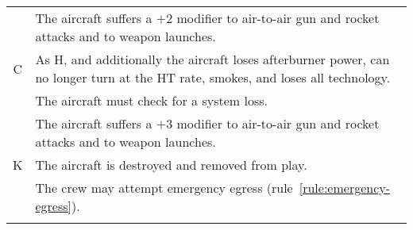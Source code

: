 \begin{onecolumntablefloat}[t!]
\begin{onecolumntable}
{\begin{tabularx}{\linewidth}{cX}
\addlinespace
&The aircraft suffers a $+2$ modifier to air-to-air gun and rocket attacks and to weapon launches.\\
\addlinespace
C&As H, and additionally the aircraft loses afterburner power, can no longer turn at the HT rate, smokes, and loses all technology.\\
\addlinespace
&The aircraft must check for a system loss.\\
\addlinespace
&The aircraft suffers a $+3$ modifier to air-to-air gun and rocket attacks and to weapon launches.\\
\addlinespace
K&The aircraft is destroyed and removed from play.\\
\addlinespace
&The crew may attempt emergency egress (rule~\ref{rule:emergency-egress}).\\
\addlinespace
\bottomrule
\end{tabularx}

}
\end{onecolumntable}
\end{onecolumntablefloat}